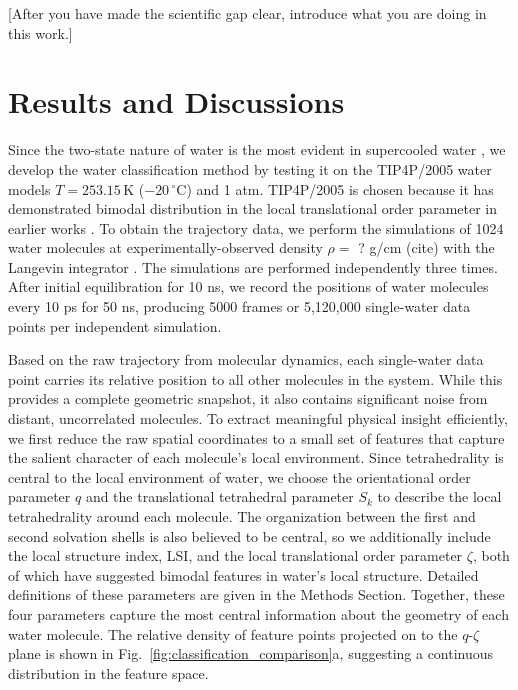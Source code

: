 \documentclass[aps, amsmath,amssymb, reprint, twocolumn, superscriptaddress]{revtex4-2}
\newcommand{\comment}[1]{\textcolor{Mahogany}{#1}}
\begin{document}
\comment{[After you have made the scientific gap clear, introduce what you are doing in this work.]}





\section{Results and Discussions}
Since the two-state nature of water is the most evident in supercooled water \cite{russo_understanding_2014}, we develop the water classification method by testing it on the TIP4P/2005 water models $T = 253.15\,\mathrm{K}$ ($-20\,^\circ$C) and 1 atm. TIP4P/2005 is chosen because it has demonstrated bimodal distribution in the local translational order parameter in earlier works \cite{russo_understanding_2014}. To obtain the trajectory data, we perform the simulations of 1024 water molecules at experimentally-observed density $\rho = $ ? g/cm (cite) with the Langevin integrator \cite{Izaguirre2010} . The simulations are performed independently three times. After initial equilibration for 10 ns, we record the positions of water molecules every 10 ps for 50 ns, producing 5000 frames or 5,120,000 single-water data points per independent simulation. 


Based on the raw trajectory from molecular dynamics, each single-water data point carries its relative position to all other molecules in the system. While this provides a complete geometric snapshot, it also contains significant noise from distant, uncorrelated molecules. To extract meaningful physical insight efficiently, we first reduce the raw spatial coordinates to a small set of features that capture the salient character of each molecule's local environment. Since tetrahedrality is central to the local environment of water\cite{errington_relationship_2001,russo_understanding_2014,tanaka_revealing_2019}, we choose the orientational order parameter $q$ and the translational tetrahedral parameter $S_k$ to describe the local tetrahedrality around each molecule\cite{chau_new_1998,errington_relationship_2001,duboue-dijon_characterization_2015}. The organization between the first and second solvation shells is also believed to be central, so we additionally include the local structure index, LSI, and the local translational order parameter $\zeta$, both of which have suggested bimodal features in water's local structure\cite{shiratani_growth_1996,russo_understanding_2014}. Detailed definitions of these parameters are given in the Methods Section. Together, these four parameters capture the most central information about the geometry of each water molecule. The relative density of feature points projected on to the $q$-$\zeta$ plane is shown in  Fig.~\ref{fig:classification_comparison}a, suggesting a continuous distribution in the feature space.
\end{document}
